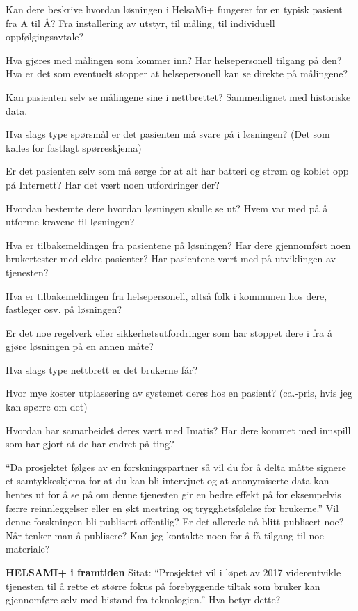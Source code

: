 Kan dere beskrive hvordan løsningen i HelsaMi+ fungerer for en typisk pasient fra A til Å? Fra installering av utstyr, til måling, til individuell oppfølgingsavtale?
 
Hva gjøres med målingen som kommer inn? Har helsepersonell tilgang på den? Hva er det som eventuelt stopper at helsepersonell kan se direkte på målingene?
 
Kan pasienten selv se målingene sine i nettbrettet? Sammenlignet med historiske data.
 
Hva slags type spørsmål er det pasienten må svare på i løsningen? (Det som kalles for fastlagt spørreskjema)
 
Er det pasienten selv som må sørge for at alt har batteri og strøm og koblet opp på Internett? Har det vært noen utfordringer der?
 
Hvordan bestemte dere hvordan løsningen skulle se ut? Hvem var med på å utforme kravene til løsningen? 
 
Hva er tilbakemeldingen fra pasientene på løsningen? Har dere gjennomført noen brukertester med eldre pasienter? Har pasientene vært med på utviklingen av tjenesten?
 
Hva er tilbakemeldingen fra helsepersonell, altså folk i kommunen hos dere, fastleger osv. på løsningen?
 
Er det noe regelverk eller sikkerhetsutfordringer som har stoppet dere i fra å gjøre løsningen på en annen måte?
 
Hva slags type nettbrett er det brukerne får?
 
Hvor mye koster utplassering av systemet deres hos en pasient? (ca.-pris, hvis jeg kan spørre om det)
 
Hvordan har samarbeidet deres vært med Imatis? 
Har dere kommet med innspill som har gjort at de har endret på ting? 
 
“Da prosjektet følges av en forskningspartner så vil du for å delta måtte signere et samtykkeskjema for at du kan bli intervjuet og at anonymiserte data kan hentes ut for å se på om denne tjenesten gir en bedre effekt på for eksempelvis færre reinnleggelser eller en økt mestring og trygghetsfølelse for brukerne.”
Vil denne forskningen bli publisert offentlig? Er det allerede nå blitt publisert noe? Når tenker man å publisere? Kan jeg kontakte noen for å få tilgang til noe materiale? 
 
\textbf{HELSAMI+ i framtiden}
Sitat: “Prosjektet vil i løpet av 2017 videreutvikle tjenesten til å rette et større fokus på forebyggende tiltak som bruker kan gjennomføre selv med bistand fra teknologien.”
Hva betyr dette?
 
